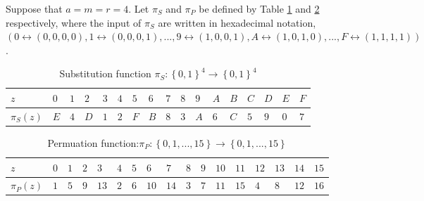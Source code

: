 \begin{exmp}
\label{SPN_Example} \citep{spn_definition_book} Suppose that $a = m = r = 4$. Let $\pi_S$ and $\pi_P$ be defined by Table \ref{table: substitution_table} and \ref{table: permutation_table} respectively, where the input of $\pi_S$ are written in hexadecimal notation, $(0 \leftrightarrow (0,0,0,0), 1 \leftrightarrow (0,0,0,1),...,9 \leftrightarrow (1,0,0,1), A \leftrightarrow (1,0,1,0),...,F \leftrightarrow (1,1,1,1))$. 
\end{exmp}

\begin{table}
\centering
\begin{tabular}{|l|l|l|l|l|l|l|l|l|l|l|l|l|l|l|l|l|}
\hline
$z$ & $0$ & $1$ & $2$ & $3$ & $4$ & $5$  & $6$ & $7$ & $8$ & $9$ & $A$ & $B$ & $C$ & $D$  & $E$ & $F$ \\
\hline
$\pi_S(z)$ & $E$ & $4$ & $D$ & $1$ & $2$ & $F$ & $B$ & $8$ & $3$ & $A$ & $6$ & $C$ & $5$ & $9$ & $0$ & $7$  \\
\hline
\end{tabular}
\caption{Substitution function $\pi_S:\left\lbrace 0,1 \right\rbrace^{4} \rightarrow \left\lbrace 0,1 \right\rbrace^{4}$}
\label{table: substitution_table}
\end{table} 
\begin{table}
\centering
\begin{tabular}{|l|l|l|l|l|l|l|l|l|l|l|l|l|l|l|l|l|}
\hline
$z$ & $0$ & $1$ & $2$ & $3$ & $4$ & $5$  & $6$ & $7$ & $8$ & $9$ & $10$ & $11$ & $12$ & $13$  & $14$ & $15$ \\
\hline
$\pi_P(z)$ & $1$ & $5$ & $9$ & $13$ & $2$ & $6$ & $10$ & $14$ & $3$ & $7$ & $11$ & $15$ & $4$ & $8$ & $12$ & $16$  \\
\hline
\end{tabular}
\caption{Permuation function:$\pi_P: \left\lbrace 0,1,...,15\right\rbrace \rightarrow \left\lbrace 0,1,...,15\right\rbrace$}
\label{table: permutation_table}
\end{table}
